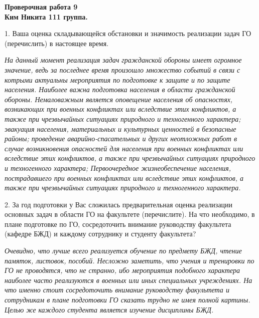 \documentclass[a4paper, 12pt]{article}
\theoremstyle{definition}
\begin{document}
    \fontsize{14pt}{20pt}\selectfont
    \begin{center}
        \begin{Large}
            \textbf{Проверочная работа 9}\\
            \textbf{Ким Никита 111 группа.} 
        \end{Large}
    \end{center}
    1. Ваша оценка складывающейся обстановки и
    значимость реализации задач ГО (перечислить) в
    настоящее время.

    \textit{На данный момент реализация задач гражданской обороны имеет огромное значение, ведь за последнее время произошло множество событий в связи с котрыми актуальны мероприятия по подготовке к защите и по защите населения. Наиболее важна подготовка населения в области гражданской обороны. Немаловажным является оповещение населения об опасностях, возникающих при военных конфликтах или вследствие этих конфликтов, а также при чрезвычайных ситуациях природного и техногенного характера; эвакуация населения, материальных и культурных ценностей в безопасные районы; проведение аварийно-спасательных и других неотложных работ в случае возникновения опасностей для населения при военных конфликтах или вследствие этих конфликтов, а также при чрезвычайных ситуациях природного и техногенного характера; Первоочередное жизнеобеспечение населения, пострадавшего при военных конфликтах или вследствие этих конфликтов, а также при чрезвычайных ситуациях природного и техногенного характера.}

    2. За год подготовки у Вас сложилась
    предварительная оценка реализации основных
    задач в области ГО на факультете (перечислите).
    На что необходимо, в плане подготовке по ГО,
    сосредоточить внимание руководству факультета
    (кафедре БЖД) и каждому сотруднику и студенту
    факультета?

    \textit{Очевидно, что лучше всего реализуется обучение по предмету БЖД, чтение памяток, листовок, пособий. Несложно заметить, что учения и тренировки по ГО не проводятся, что не странно, ибо мероприятия подобного характера наиболее часто реализуются в военных или иных специальных учреждениях. На что именно стоит сосредоточить внимание руководству факультета и сотрудникам в плане подготовки ГО сказать трудно не имея полной картины. Целью же каждого студента является изучение дисциплины БЖД.}
\end{document}
